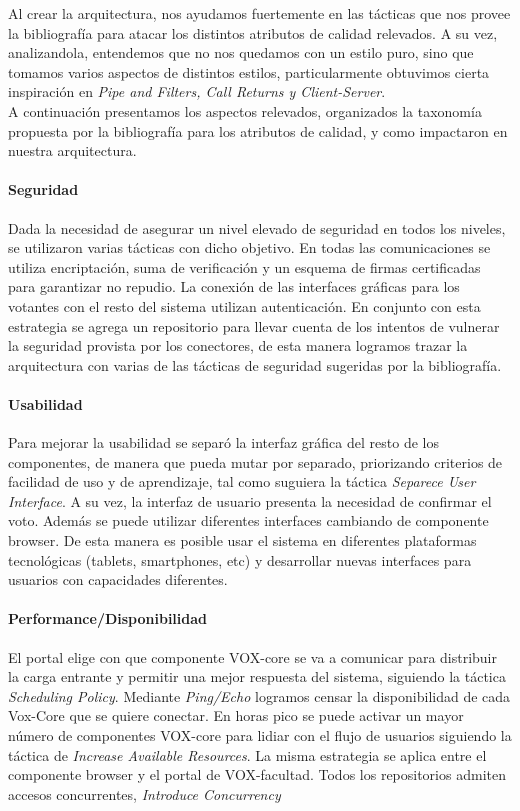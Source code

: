 Al crear la arquitectura, nos ayudamos fuertemente en las tácticas que nos provee la bibliografía para atacar los distintos atributos de calidad relevados. A su vez, analizandola, entendemos que no nos quedamos con un estilo puro, sino que tomamos varios aspectos de distintos estilos, particularmente obtuvimos cierta inspiración en \textit{Pipe and Filters, Call Returns y Client-Server}. \\ A continuación presentamos los aspectos relevados, organizados la taxonomía propuesta por la bibliografía para los atributos de calidad, y como impactaron en nuestra arquitectura.
 


\paragraph{Seguridad}
Dada la necesidad de asegurar un nivel elevado de seguridad en todos los niveles, se utilizaron varias tácticas con dicho objetivo. En todas las comunicaciones se utiliza encriptación, suma de verificación y un esquema de firmas certificadas para garantizar no repudio. La conexión de las interfaces gráficas para los votantes con el resto del sistema utilizan autenticación. En conjunto con esta estrategia se agrega un repositorio para llevar cuenta de los intentos de vulnerar la seguridad provista por los conectores, de esta manera logramos trazar la arquitectura con varias de las tácticas de seguridad sugeridas por la bibliografía.

\paragraph{Usabilidad}
Para mejorar la usabilidad se separó la interfaz gráfica del resto de los componentes, de manera que pueda mutar por separado, priorizando criterios de facilidad de uso y de aprendizaje, tal como suguiera la táctica \textit{Separece User Interface}. A su vez, la interfaz de usuario presenta la necesidad de confirmar el voto. Además se puede utilizar diferentes interfaces cambiando de componente browser. De esta manera es posible usar el sistema en diferentes plataformas tecnológicas (tablets, smartphones, etc) y desarrollar nuevas interfaces para usuarios con capacidades diferentes.

\paragraph{Performance/Disponibilidad}
El portal elige con que componente VOX-core se va a comunicar para distribuir la carga entrante y permitir una mejor respuesta del sistema, siguiendo la táctica \textit{Scheduling Policy}. Mediante \textit{Ping/Echo} logramos censar la disponibilidad de cada Vox-Core que se quiere conectar. En horas pico se puede activar un mayor número de componentes VOX-core para lidiar con el flujo de usuarios siguiendo la táctica de \textit{Increase Available Resources}. La misma estrategia se aplica entre el componente browser y el portal de VOX-facultad.
Todos los repositorios admiten accesos concurrentes, \textit{Introduce Concurrency}

